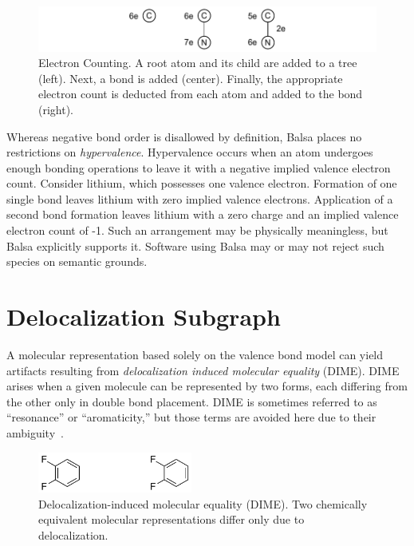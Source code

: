 \documentclass{article}
\begin{document}
\begin{figure}
    \centering
    \includegraphics[width=\columnwidth]{electron-counting.pdf}
    \caption{Electron Counting. A root atom and its child are added to a tree (left). Next, a bond is added (center). Finally, the appropriate electron count is deducted from each atom and added to the bond (right).}
    \label{fig:electron-counting}
\end{figure}

Whereas negative bond order is disallowed by definition, Balsa places no restrictions on \textit{hypervalence}. Hypervalence occurs when an atom undergoes enough bonding operations to leave it with a negative implied valence electron count. Consider lithium, which possesses one valence electron. Formation of one single bond leaves lithium with zero implied valence electrons. Application of a second bond formation leaves lithium with a zero charge and an implied valence electron count of -1. Such an arrangement may be physically meaningless, but Balsa explicitly supports it. Software using Balsa may or may not reject such species on semantic grounds.

\section*{Delocalization Subgraph}
\label{delocalization-subgraph}

A molecular representation based solely on the valence bond model can yield artifacts resulting from \textit{delocalization induced molecular equality} (DIME). DIME arises when a given molecule can be represented by two forms, each differing from the other only in double bond placement. DIME is sometimes referred to as \enquote{resonance} or \enquote{aromaticity,} but those terms are avoided here due to their ambiguity~\cite{randic:2018,kerber:2006}.

\begin{figure}
    \centering
    \includegraphics[width=2in]{dime.pdf}
    \caption{Delocalization-induced molecular equality (DIME). Two chemically equivalent molecular representations differ only due to delocalization.}
    \label{fig:dime}
\end{figure}
\end{document}
